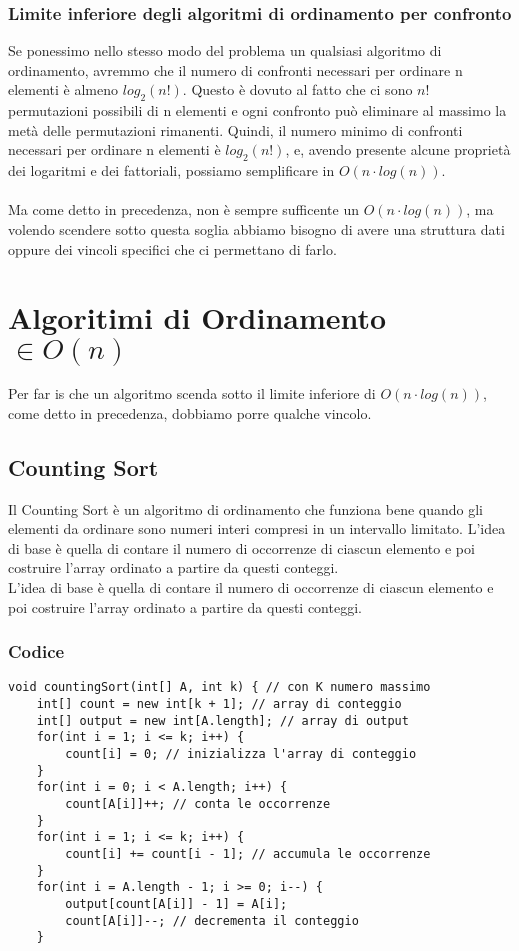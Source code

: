 \documentclass[a4paper,12pt]{article}
\begin{document}
\subsubsection*{Limite inferiore degli algoritmi di ordinamento per confronto}
Se ponessimo nello stesso modo del problema un qualsiasi algoritmo di ordinamento, avremmo che il numero di confronti necessari per ordinare n elementi è almeno $log_{2}(n!)$.
Questo è dovuto al fatto che ci sono $n!$ permutazioni possibili di n elementi e ogni confronto può eliminare al massimo la metà delle permutazioni rimanenti. Quindi, il numero minimo di confronti necessari per ordinare n elementi è $log_{2}(n!)$,
e, avendo presente alcune proprietà dei logaritmi e dei fattoriali, possiamo semplificare in $O(n \cdot log(n))$.\\
\\
Ma come detto in precedenza, non è sempre sufficente un $O(n\cdot log(n))$,  ma volendo scendere sotto questa soglia abbiamo bisogno di avere una struttura dati oppure dei vincoli specifici che ci permettano di farlo. \\


\section{Algoritimi di Ordinamento $\in O(n)$}
Per far is che un algoritmo scenda sotto il limite inferiore di $O(n \cdot log(n))$, come detto in precedenza, dobbiamo porre qualche vincolo.
\subsection{Counting Sort}
Il Counting Sort è un algoritmo di ordinamento che funziona bene quando gli elementi da ordinare sono numeri interi compresi in un intervallo limitato. L'idea di base è quella di contare il numero di occorrenze di ciascun elemento e poi costruire l'array ordinato a partire da questi conteggi. \\
L'idea di base è quella di contare il numero di occorrenze di ciascun elemento e poi costruire l'array ordinato a partire da questi conteggi. 
\subsubsection{\textcolor{codice}{Codice}}
\begin{lstlisting}[style=mystyle]
void countingSort(int[] A, int k) { // con K numero massimo
    int[] count = new int[k + 1]; // array di conteggio
    int[] output = new int[A.length]; // array di output
    for(int i = 1; i <= k; i++) {
        count[i] = 0; // inizializza l'array di conteggio
    }
    for(int i = 0; i < A.length; i++) {
        count[A[i]]++; // conta le occorrenze
    }
    for(int i = 1; i <= k; i++) {
        count[i] += count[i - 1]; // accumula le occorrenze
    }
    for(int i = A.length - 1; i >= 0; i--) {
        output[count[A[i]] - 1] = A[i];
        count[A[i]]--; // decrementa il conteggio
    }
\end{lstlisting}
\end{document}
